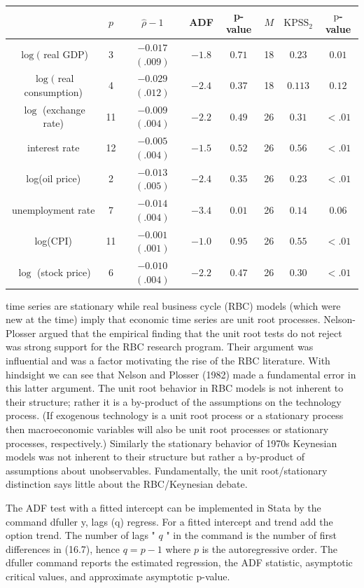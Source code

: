 \documentclass[10pt]{article}
\begin{document}
\begin{tabular}{cccccccc}
\hline\hline
 & $p$ & $\widehat{\rho}-1$ & ADF & p-value & $M$ & $\mathrm{KPSS}_{2}$ & $\mathrm{p}$-value \\
\hline
$\log ($ real GDP) & 3 & $-0.017$ $(.009)$ & $-1.8$ & $0.71$ & 18 & $0.23$ & $0.01$ \\
\hline
$\log ($ real consumption) & 4 & $-0.029$ $(.012)$ & $-2.4$ & $0.37$ & 18 & $0.113$ & $0.12$ \\
\hline
$\log$ (exchange rate) & 11 & $-0.009$ $(.004)$ & $-2.2$ & $0.49$ & 26 & $0.31$ & $<.01$ \\
\hline
interest rate & 12 & $-0.005$ $(.004)$ & $-1.5$ & $0.52$ & 26 & $0.56$ & $<.01$ \\
\hline
log(oil price) & 2 & $-0.013$ $(.005)$ & $-2.4$ & $0.35$ & 26 & $0.23$ & $<.01$ \\
\hline
unemployment rate & 7 & $-0.014$ $(.004)$ & $-3.4$ & $0.01$ & 26 & $0.14$ & $0.06$ \\
\hline
log(CPI) & 11 & $-0.001$ $(.001)$ & $-1.0$ & $0.95$ & 26 & $0.55$ & $<.01$ \\
\hline
$\log$ (stock price) & 6 & $-0.010$ $(.004)$ & $-2.2$ & $0.47$ & 26 & $0.30$ & $<.01$ \\
\hline
\end{tabular}

time series are stationary while real business cycle (RBC) models (which were new at the time) imply that economic time series are unit root processes. Nelson-Plosser argued that the empirical finding that the unit root tests do not reject was strong support for the RBC research program. Their argument was influential and was a factor motivating the rise of the RBC literature. With hindsight we can see that Nelson and Plosser (1982) made a fundamental error in this latter argument. The unit root behavior in RBC models is not inherent to their structure; rather it is a by-product of the assumptions on the technology process. (If exogenous technology is a unit root process or a stationary process then macroeconomic variables will also be unit root processes or stationary processes, respectively.) Similarly the stationary behavior of 1970s Keynesian models was not inherent to their structure but rather a by-product of assumptions about unobservables. Fundamentally, the unit root/stationary distinction says little about the RBC/Keynesian debate.

The ADF test with a fitted intercept can be implemented in Stata by the command dfuller y, lags (q) regress. For a fitted intercept and trend add the option trend. The number of lags " $q$ " in the command is the number of first differences in (16.7), hence $q=p-1$ where $p$ is the autoregressive order. The dfuller command reports the estimated regression, the ADF statistic, asymptotic critical values, and approximate asymptotic p-value.
\end{document}

